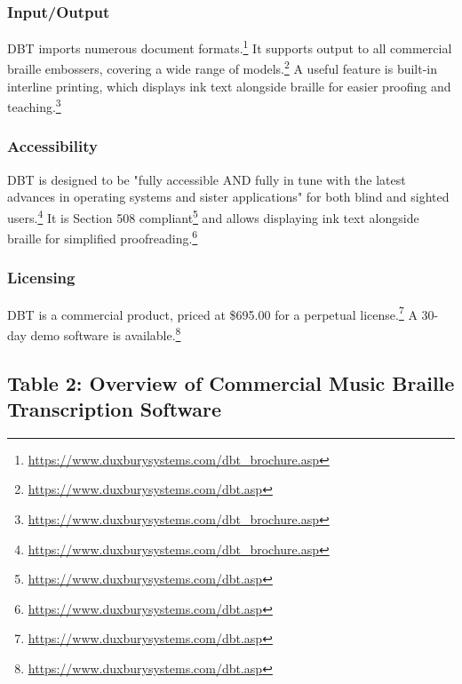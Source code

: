 \subsubsection{Input/Output}
DBT imports numerous document formats.\footnote{\url{https://www.duxburysystems.com/dbt_brochure.asp}} It supports output to all commercial braille embossers, covering a wide range of models.\footnote{\url{https://www.duxburysystems.com/dbt.asp}} A useful feature is built-in interline printing, which displays ink text alongside braille for easier proofing and teaching.\footnote{\url{https://www.duxburysystems.com/dbt_brochure.asp}}

\subsubsection{Accessibility}
DBT is designed to be "fully accessible AND fully in tune with the latest advances in operating systems and sister applications" for both blind and sighted users.\footnote{\url{https://www.duxburysystems.com/dbt_brochure.asp}} It is Section 508 compliant\footnote{\url{https://www.duxburysystems.com/dbt.asp}} and allows displaying ink text alongside braille for simplified proofreading.\footnote{\url{https://www.duxburysystems.com/dbt.asp}}

\subsubsection{Licensing}
DBT is a commercial product, priced at \$695.00 for a perpetual license.\footnote{\url{https://www.duxburysystems.com/dbt.asp}} A 30-day demo software is available.\footnote{\url{https://www.duxburysystems.com/dbt.asp}}

\subsection{Table 2: Overview of Commercial Music Braille Transcription Software}

